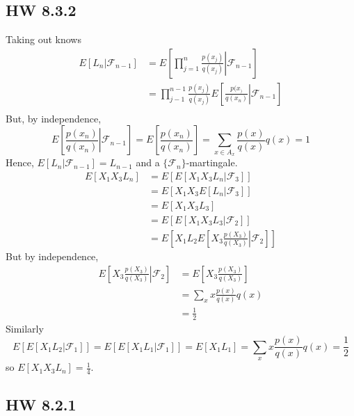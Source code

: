 \documentclass[11pt]{article}
\begin{document}
\subsection{HW 8.3.2}
Taking out knows
\begin{equation*}
    \begin{aligned}
        E[L_n | \mathcal{F}_{n-1}] &= E \left[ \left.\prod_{j=1}^n \frac{p(x_j)}{q(x_j)} \right| \mathcal{F}_{n-1}\right] \\
        &= \prod_{j-1}^{n-1} \frac{p(x_j)}{q(x_j)} E \left[ \left.\frac{p(x_)}{q(x_n)} \right| \mathcal{F}_{n-1} \right] \\
    \end{aligned}
\end{equation*}
But, by independence, 
\[
    E\left[ \left. \frac{p(x_n)}{q(x_n)} \right| \mathcal{F}_{n-1} \right] = E\left[ \frac{p(x_n)}{q(x_n)} \right] = \sum_{x \in A_x} \frac{p(x)}{q(x)} q(x) = 1
\]
Hence, $E[L_n|\mathcal{F}_{n-1}] = L_{n-1}$ and a $\{ \mathcal{F}_n \}$-martingale. \\
\begin{equation*}
    \begin{aligned}
        E[X_1X_3L_n] &= E[E[X_1X_3 L_n | \mathcal{F}_3]] \\
        &= E[X_1X_3E[L_n | \mathcal{F}_3]] \\
        &= E[X_1X_3L_3] \\
        &= E[E[X_1X_3L_3 | \mathcal{F}_2]] \\
        &= E\left[X_1L_2 E\left[ \left.X_3 \frac{p(X_3)}{q(X_3)}  \right| \mathcal{F}_2 \right]\right]
    \end{aligned}
\end{equation*}
But by independence, 
\begin{equation*}
    \begin{aligned}
        E\left[ \left. X_3 \frac{p(X_3)}{q(X_3)} \right| \mathcal{F}_2 \right] &= E\left[X_3 \frac{p(X_3)}{q(X_3)} \right] \\
        &= \sum_x x\frac{p(x)}{q(x)} q(x)\\
        &= \frac{1}{2}
    \end{aligned}
\end{equation*}
Similarly
\[
    E[E[X_1L_2|\mathcal{F}_1]] = E[E[X_1L_1|\mathcal{F}_1]] = E[X_1L_1] =  \sum_x x \frac{p(x)}{q(x)} q(x) = \frac{1}{2} 
\]
so $E[X_1X_3L_n] = \frac{1}{4}$.
\subsection{HW 8.2.1}
\end{document}
